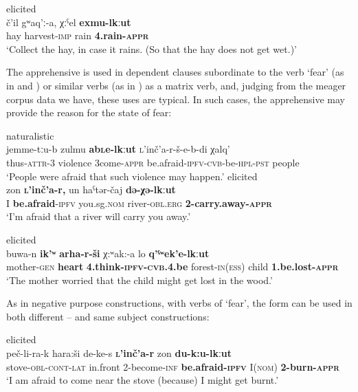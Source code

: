 \documentclass[output=paper,colorlinks,citecolor=brown]{langscibook}
\begin{document}
\ea \label{ex:DD20} \textnormal{elicited} \\
\gll č'il gʷaq'ː-a,  χːˁel \textbf{exmu-lkːut} \\
hay harvest-\textsc{imp} rain \textbf{4.rain-\textsc{appr}} \\
\glt `Collect the hay, in case it rains. (So that the hay does not get wet.)'
\z

 The apprehensive is used in dependent clauses subordinate to the verb `fear' (as in  and ) or similar verbs (as in ) as a matrix verb, and, judging from the meager corpus data we have, these uses are typical. In such cases, the apprehensive may provide the reason for the state of fear:

    \ea \label{ex:DD21} \textnormal{naturalistic} \\
\gll jemme-tːu-b zulmu \textbf{a{\textlangle}b{\textrangle}\textsc{l}e-lkːut} \textsc{l}'inč'a-r-š-e-b-di χalq' \\
thus-\textsc{attr}-3 violence {\textlangle}3{\textrangle}come-\textsc{appr} be.afraid-\textsc{ipfv-cvb}-be-\textsc{hpl-pst} people \\
\glt `People were afraid that such violence may happen.'
\z
\newpage
\ea \label{ex:DD22} \textnormal{elicited} \\
\gll zon \textbf{\textsc{l}'inč'a-r,} un haˁtər-čaj \textbf{də-χə-lkːut} \\
I \textbf{be.afraid}-\textsc{ipfv} you.sg\textsc{.nom} river-\textsc{obl.erg} \textbf{2-carry.away-\textsc{appr}} \\
\glt `I'm afraid that a river will carry you away.'
\z

\ea \label{ex:DD23} \textnormal{elicited} \\
\gll buwa-n \textbf{ik'ʷ} \textbf{arha-r-ši} χ:ʷak:-a lo \textbf{q'ˤʷek'e-lkːut} \\
mother-\textsc{gen} \textbf{heart} \textbf{4.think-\textsc{ipfv-cvb}.4.be} forest-\textsc{in(ess)} child \textbf{1.be.lost-\textsc{appr}} \\
\glt `The mother worried that the child might get lost in the wood.' 
\z


\noindent As in negative purpose constructions, with verbs of `fear', the form can be used in both different -- and same  subject constructions:


\ea \label{ex:DD24} \textnormal{elicited} \\
\gll peč-li-ra-k hara:ši de-ke-s \textbf{\textsc{l}'inč'a-r} zon \textbf{du-k:u-lkːut} \\
stove-\textsc{obl-cont-lat} in.front 2-become-\textsc{inf} \textbf{be.afraid-\textsc{ipfv}} I(\textsc{nom}) \textbf{2-burn-\textsc{appr}} \\
\glt `I am afraid to come near the stove (because) I might get burnt.'
\z
\end{document}

